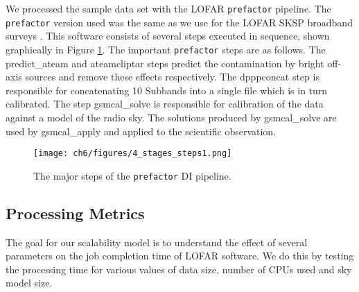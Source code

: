 We processed the sample data set with the LOFAR \texttt{prefactor} pipeline. The \texttt{prefactor} version used was the same as we use for the LOFAR SKSP broadband surveys \citep{prefactor_zenodo}. This software consists of several steps executed in sequence, shown graphically in Figure \ref{fig:ch6_prefactor_steps}. The important \texttt{prefactor} steps are as follows. The {\selectfont predict\_ateam} and {\selectfont ateamcliptar} steps predict the contamination by bright off-axis sources and remove these effects respectively. The {\selectfont dpppconcat} step is responsible for concatenating 10 Subbands into a single file which is in turn calibrated. The step {\selectfont gsmcal\_solve} is responsible for calibration of the data against a model of the radio sky. The solutions produced by {\selectfont gsmcal\_solve} are used by {\selectfont gsmcal\_apply} and applied to the scientific observation.

\begin{figure}
    \texttt{[image: ch6/figures/4\_stages\_steps1.png]}
      \caption{The major steps of the \texttt{prefactor} DI pipeline. }
	\label{fig:ch6_prefactor_steps}
\end{figure}

\subsection{Processing Metrics}
The goal for our scalability model is to understand the effect of several parameters on the job completion time of LOFAR software. We do this by testing the processing time for various values of data size, number of CPUs used and sky model size. 
 

